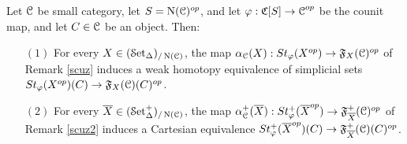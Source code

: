 \begin{lemma}\label{standrum}
Let $\operatorname{\mathcal{C}}$ be small category, let $S = \operatorname{N}(\operatorname{\mathcal{C}})^{op}$, and let $\varphi: \operatorname{\mathfrak{C}}[S] \rightarrow \operatorname{\mathcal{C}}^{op}$ be the counit map, and let $C \in \operatorname{\mathcal{C}}$ be an object. Then:
\begin{itemize}
\item[$(1)$] For every $X \in (\operatorname{\mathcal{S}et_{\Delta}})_{/ \operatorname{N}(\operatorname{\mathcal{C}})}$, the map 
$\alpha_{\operatorname{\mathcal{C}}}(X): St_{\varphi}(X^{op}) \rightarrow {\mathfrak F}_{X}(\operatorname{\mathcal{C}})^{op}$ of Remark \ref{scuz} induces
a weak homotopy equivalence of simplicial sets $St_{\varphi}(X^{op})(C) \rightarrow {\mathfrak F}_{X}(\operatorname{\mathcal{C}})(C)^{op}$.
\item[$(2)$] For every $\overline{X} \in (\operatorname{\mathcal{S}et}^{+}_{\Delta})_{/\operatorname{N}(\operatorname{\mathcal{C}})}$, the map
$\alpha^{+}_{\operatorname{\mathcal{C}}}( \overline{X}): St^{+}_{\varphi}( \overline{X}^{op}) \rightarrow {\mathfrak F}^{+}_{\overline{X}}(\operatorname{\mathcal{C}})^{op}$ of Remark \ref{scuz2} induces a Cartesian equivalence $St^{+}_{\varphi}( \overline{X}^{op})(C) \rightarrow {\mathfrak F}^{+}_{\overline{X}}(\operatorname{\mathcal{C}})(C)^{op}$. 
\end{itemize}
\end{lemma}

